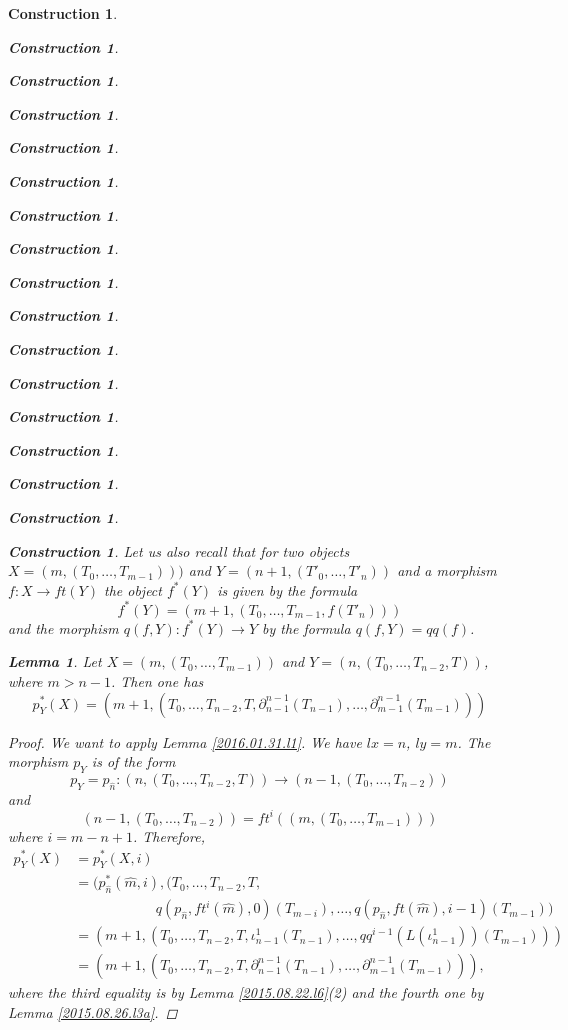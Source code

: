 \documentclass[onecolumn,12pt]{amsart}
\newtheorem{lemma}[proposition]{Lemma}
\numberwithin{proposition}{subsection}
\newtheorem{construction}[proposition]{Construction}
\newcommand{\sr}{\rightarrow}
\newcommand{\wh}{\widehat}
\newcommand{\spc}{{\,\,\,\,\,\,\,}}
\begin{document}
\begin{construction}
\begin{construction}
\begin{construction}
\begin{construction}
\begin{construction}
\begin{construction}
\begin{construction}
\begin{construction}
\begin{construction}
\begin{construction}
\begin{construction}
\begin{construction}
\begin{construction}
\begin{construction}
\begin{construction}
\begin{construction}
\begin{construction}
Let us also recall that for two objects $X=(m,(T_0,\dots,T_{m-1})))$ and
$Y=(n+1,(T'_0,\dots,T'_{n}))$ and a morphism $f:X\sr ft(Y)$ the object $f^*(Y)$
is given by the formula
%
\begin{equation}\label{2015.09.09.eq3old}
f^*(Y)=(m+1,(T_0,\dots,T_{m-1},f(T'_{n})))
\end{equation}%
%
and the morphism $q(f,Y):f^*(Y)\sr Y$ by the formula $q(f,Y)=qq(f)$. 
% 
\begin{lemma}
\label{2015.08.26.l8}
Let $X=(m,(T_0,\dots,T_{m-1}))$ and $Y=(n,(T_0,\dots,T_{n-2},T))$, where $m>n-1$. Then one has
%
$$p_{Y}^*(X)=(m+1,(T_0,\dots,T_{n-2},T,\partial_{n-1}^{n-1}(T_{n-1}),\dots,\partial_{m-1}^{n-1}(T_{m-1})))$$
%
\end{lemma}
%
\begin{proof}
We want to apply Lemma \ref{2016.01.31.l1}. We have $lx=n$, $ly=m$. The morphism $p_Y$ is of the form
%
$$p_Y=p_{\wh{n}}:(n,(T_0,\dots,T_{n-2},T))\sr (n-1,(T_0,\dots,T_{n-2}))$$
%
and 
%
$$(n-1,(T_0,\dots,T_{n-2}))=ft^i((m,(T_0,\dots,T_{m-1})))$$
%
where $i=m-n+1$. Therefore, 
%
\begin{equation*}
  \begin{split}
    p_Y^*(X)&=p_Y^*(X,i)
    \\&=
    (p_{\wh{n}}^*(\wh{m},i), (T_0,\dots,T_{n-2},T,
    \\& \spc\spc\spc\spc\spc
           q(p_{\wh{n}},ft^i(\wh{m}),0)(T_{m-i}),\dots,q(p_{\wh{n}},ft(\wh{m}),i-1)(T_{m-1}))
    \\&=
    (m+1,(T_0,\dots,T_{n-2},T,\iota_{n-1}^1(T_{n-1}),\dots,qq^{i-1}(L(\iota_{n-1}^1))(T_{m-1})))
    \\&=
    (m+1,(T_0,\dots,T_{n-2},T,\partial_{n-1}^{n-1}(T_{n-1}),\dots,\partial_{m-1}^{n-1}(T_{m-1}))),
  \end{split}
\end{equation*}
%
where the third equality is by Lemma \ref{2015.08.22.l6}(2) and the fourth one by Lemma \ref{2015.08.26.l3a}. 
\end{proof}
%


\end{construction}
\end{construction}
\end{construction}
\end{construction}
\end{construction}
\end{construction}
\end{construction}
\end{construction}
\end{construction}
\end{construction}
\end{construction}
\end{construction}
\end{construction}
\end{construction}
\end{construction}
\end{construction}
\end{construction}
\end{document}
